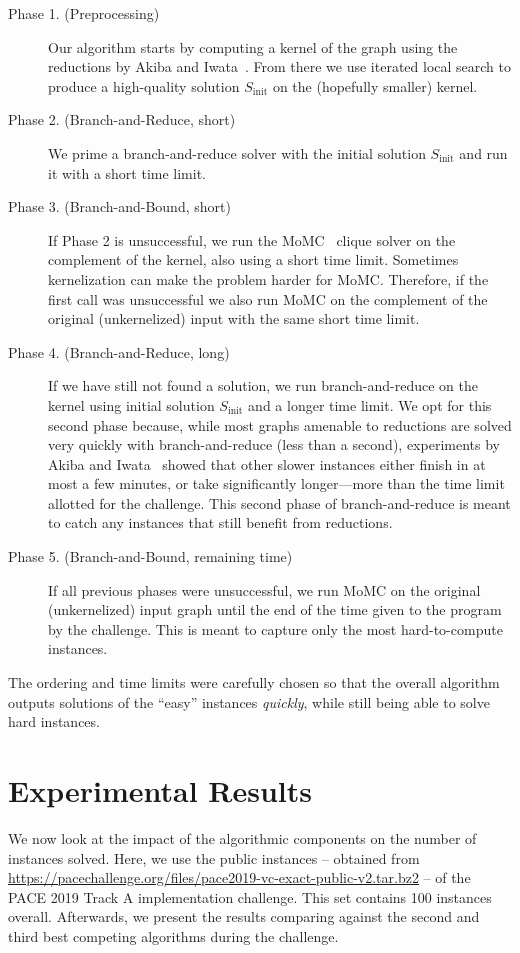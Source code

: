 \documentclass[twoside,leqno,twocolumn]{article}
\begin{document}
\begin{description}
\item[Phase 1. (Preprocessing)] Our algorithm starts by computing a kernel of the graph using the reductions by Akiba and Iwata~\cite{akiba-tcs-2016}. 
From there we use iterated local search to produce a high-quality solution $S_{\textrm{init}}$ on the (hopefully smaller) kernel. 
\item[Phase 2. (Branch-and-Reduce, short)]
We prime a branch-and-reduce solver with the initial solution $S_{\textrm{init}}$ and run it with a short time limit.
\item[Phase 3. (Branch-and-Bound, short)]
If Phase 2 is unsuccessful, we run the MoMC~\cite{DBLP:journals/cor/LiJM17} clique solver on the complement of the kernel, also using a short time limit. Sometimes kernelization can make the problem harder for MoMC. Therefore, if the first call was unsuccessful we also run MoMC on the complement of the original (unkernelized) input with the same short time limit.

\item[Phase 4. (Branch-and-Reduce, long)]
If we have still not found a solution, we run branch-and-reduce on the kernel using initial solution $S_{\textrm{init}}$ and a longer time limit. We opt for this second phase because, while most graphs amenable to reductions are solved very quickly with branch-and-reduce (less than a second),
experiments by Akiba and Iwata~\cite{akiba-tcs-2016} showed that other slower instances either finish in at most a few minutes, or take significantly longer---more than the time limit allotted for the challenge. This second phase of branch-and-reduce is meant to catch any instances that still benefit from reductions.

\item[Phase 5. (Branch-and-Bound, remaining time)]
If all previous phases were unsuccessful, we run MoMC on the original (unkernelized) input graph until the end of the time given to the program by the challenge. This is meant to capture only the most hard-to-compute instances.
\end{description}

The ordering and time limits were carefully chosen so that the overall algorithm outputs solutions of the ``easy'' instances \emph{quickly}, while still being able to solve hard instances.
\vfill\pagebreak
\section{Experimental Results}
We now look at the impact of the algorithmic components on the number of instances solved.
Here, we use the public instances -- obtained from \url{https://pacechallenge.org/files/pace2019-vc-exact-public-v2.tar.bz2} -- of the PACE 2019 Track A implementation challenge. This set contains 100 instances overall. Afterwards, we present the results comparing against the second and third best competing algorithms during the challenge. 
\end{document}
